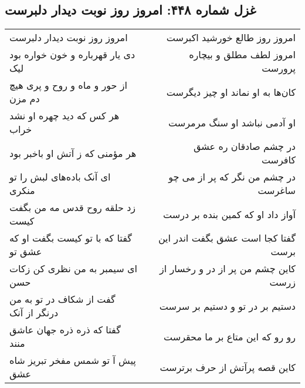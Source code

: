 \begin{center}
\section*{غزل شماره ۴۴۸: امروز روز نوبت دیدار دلبرست}
\label{sec:0448}
\begin{longtable}{l p{0.5cm} r}
امروز روز نوبت دیدار دلبرست
&&
امروز روز طالع خورشید اکبرست
\\
دی یار قهرباره و خون خواره بود لیک
&&
امروز لطف مطلق و بیچاره پرورست
\\
از حور و ماه و روح و پری هیچ دم مزن
&&
کان‌ها به او نماند او چیز دیگرست
\\
هر کس که دید چهره او نشد خراب
&&
او آدمی نباشد او سنگ مرمرست
\\
هر مؤمنی که ز آتش او باخبر بود
&&
در چشم صادقان ره عشق کافرست
\\
ای آنک باده‌های لبش را تو منکری
&&
در چشم من نگر که پر از می چو ساغرست
\\
زد حلقه روح قدس مه من بگفت کیست
&&
آواز داد او که کمین بنده بر درست
\\
گفتا که با تو کیست بگفت او که عشق تو
&&
گفتا کجا است عشق بگفت اندر این برست
\\
ای سیمبر به من نظری کن زکات حسن
&&
کاین چشم من پر از در و رخسار از زرست
\\
گفت از شکاف در تو به من درنگر از آنک
&&
دستیم بر در تو و دستیم بر سرست
\\
گفتا که ذره ذره جهان عاشق منند
&&
رو رو که این متاع بر ما محقرست
\\
پیش آ تو شمس مفخر تبریز شاه عشق
&&
کاین قصه پرآتش از حرف برترست
\\
\end{longtable}
\end{center}
